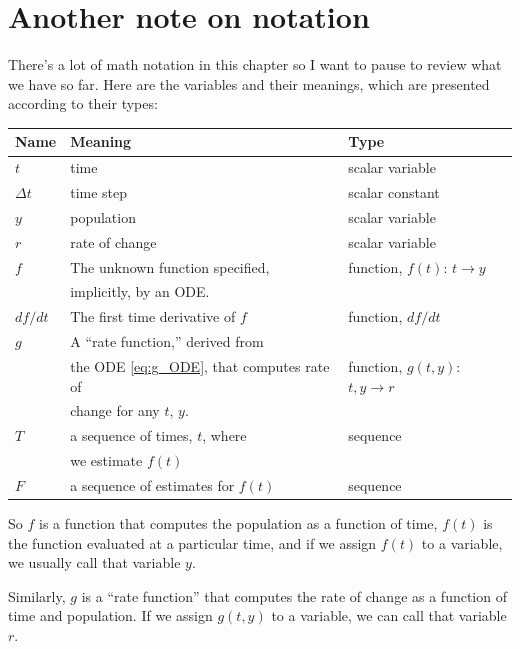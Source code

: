 \documentclass[
]{book}
\begin{document}
\section{Another note on notation}

There's a lot of math notation in this chapter so I want to pause to
review what we have so far.  Here are the variables and their meanings,
which are presented according to their types:

\begin{tabular}{|l|l|l|}
\hline
Name     &  Meaning             &  Type  \\
\hline \hline
$t$     &  time                 & scalar variable \\\hline
$\Delta t$  &  time step            & scalar constant \\\hline

$y$     &  population           & scalar variable \\\hline
$r$     &  rate of change       & scalar variable \\\hline

$f$     &  The unknown function specified,    &  function, $f(t)$: $t \to y$  \\
        &  implicitly, by an ODE.             &    \\\hline

$df/dt$  &  The first time derivative of $f$  &  function, $df/dt$  \\ \hline

$g$     &  A ``rate function,'' derived from     &  \\
        &  the ODE \eqref{eq:g_ODE}, that computes rate of &function, $g(t,y)$: $t, y \to r$  \\
        &  change for any $t$, $y$.           &   \\\hline

$T$     & a sequence of times, $t$, where   & sequence \\
              & we estimate $f(t)$    &           \\\hline
$F$     & a sequence of estimates for $f(t)$  & sequence \\
\hline
\end{tabular}

So $f$ is a function that computes the population as a function of
time, $f(t)$ is the function evaluated at a particular time, and if we
assign $f(t)$ to a variable, we usually call that variable $y$.

Similarly, $g$ is a ``rate function'' that computes the rate of change as a
function of time and population.  If we assign $g(t,y)$ to a variable,
we can call that variable $r$.
\end{document}
